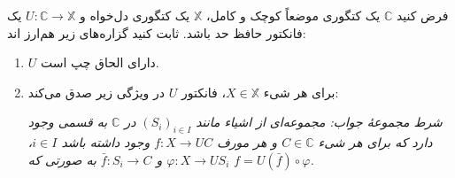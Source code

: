 فرض کنید $\mathbb{C}$ یک کتگوری موضعاً کوچک و کامل، $\mathbb{X}$ یک کتگوری دل‌خواه و $U : \mathbb{C} \to \mathbb{X}$ یک فانکتور حافظ حد باشد. ثابت کنید گزاره‌های زیر هم‌ارز اند:
\begin{enumerate}[label=.\Roman*]
  \item $U$ دارای الحاق چپ است.
  \item برای هر شیء $X \in \mathbb{X}$، فانکتور $U$ در ویژگی زیر صدق می‌کند:
  
  \textit{شرط مجموعهٔ جواب: مجموعه‌ای از اشیاء مانند $(S_i)_{i \in I}$ در $\mathbb{C}$ به قسمی وجود دارد که برای هر شیء $C \in \mathbb{C}$ و هر مورف $f : X \to UC$ وجود داشته باشد $i \in I$، $\varphi : X \to U S_i$ و $\bar{f} : S_i \to C$ به صورتی که $f = U(\bar{f}) \circ \varphi$.}
\end{enumerate}